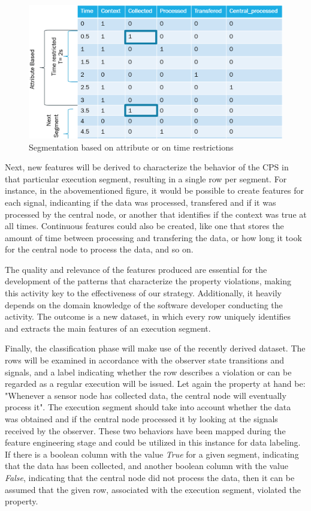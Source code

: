 \begin{figure}[!h]
	\centering
	\includegraphics[width=0.999\textwidth, keepaspectratio]{img/Segmentation2.png}
	\caption{Segmentation based on attribute or on time restrictions}
	\label{fig:Segmentation}
\end{figure}

Next, new features will be derived to characterize the behavior of the CPS in that particular execution segment, resulting in a single row per segment. For instance, in the abovementioned figure, it would be possible to create features for each signal, indicanting if the data was processed, transfered and if it was processed by the central node, or another that identifies if the context was true at all times. Continuous features could also be created, like one that stores the amount of time between processing and transfering the data, or how long it took for the central node to process the data, and so on. 

The quality and relevance of the features produced are essential for the development of the patterns that characterize the property violations, making this activity key to the effectiveness of our strategy. Additionally, it heavily depends on the domain knowledge of the software developer conducting the activity. The outcome is a new dataset, in which every row uniquely identifies and extracts the main features of an execution segment.

Finally, the classification phase will make use of the recently derived dataset. The rows will be examined in accordance with the observer state transitions and signals, and a label indicating whether the row describes a violation or can be regarded as a regular execution will be issued. Let again the property at hand be: "Whenever a sensor node has collected data, the central node will eventually process it". The execution segment should take into account whether the data was obtained and if the central node processed it by looking at the signals received by the observer. These two behaviors have been mapped during the feature engineering stage and could be utilized in this instance for data labeling. If there is a boolean column with the value \textit{True} for a given segment, indicating that the data has been collected, and another boolean column with the value \textit{False}, indicating that the central node did not process the data, then it can be assumed that the given row, associated with the execution segment, violated the property.

